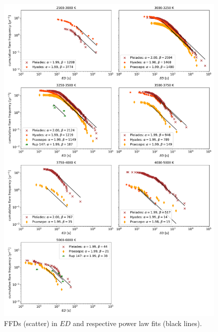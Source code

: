 \documentclass{aa}
\begin{document}
\begin{figure}
    \centering
    \includegraphics[width=16cm]{pics/FFDs/SpT_wise_sample_ffd_ED_wheatland.png}
    \caption{FFDs (scatter) in $ED$ and respective power law fits (black lines).}          	
    \label{fig:powerlawfits_s}
\end{figure}
\end{document}
